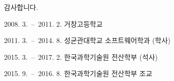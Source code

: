 \documentclass[master,english,final]{kaist-ucs}
\begin{document}
\acknowledgment[4]
    감사합니다.

\curriculumvitae[4]

    \begin{personaldata}
    \end{personaldata}

    \begin{education}
        \item[2008. 3.\ --\ 2011. 2.] 거창고등학교
        \item[2011. 3.\ --\ 2014. 8.] 성균관대학교 소프트웨어학과 (학사)
        \item[2015. 3.\ --\ 2017. 2.] 한국과학기술원 전산학부 (석사)
    \end{education}

    \begin{career}
        \item[2015. 9.\ --\ 2016. 8.] 한국과학기술원 전산학부 조교
    \end{career}

\end{document}
